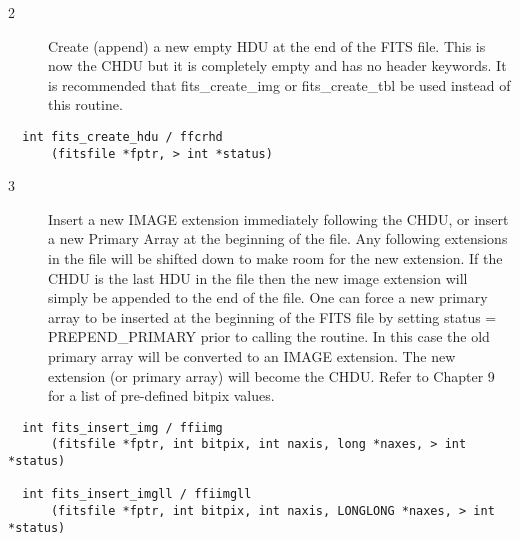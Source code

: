 \documentclass[11pt]{book}
\begin{document}
\begin{description}
\item[2 ] Create (append) a new empty HDU at the end of the FITS file.
    This is now  the CHDU but it is completely empty and has
    no header keywords.  It is recommended that fits\_create\_img or
 fits\_create\_tbl be used instead of this routine. \label{ffcrhd}
\end{description}

\begin{verbatim}
  int fits_create_hdu / ffcrhd
      (fitsfile *fptr, > int *status)
\end{verbatim}

\begin{description}
\item[3 ] Insert a new IMAGE extension immediately following the CHDU, or
    insert a new Primary Array at the beginning of the file.  Any
    following extensions in the file will be shifted down to make room
    for the new extension.  If the CHDU is the last HDU in the file
    then the new image extension will simply be appended to the end of
    the file.   One can force a new primary array to be inserted at the
    beginning of the FITS file by setting status = PREPEND\_PRIMARY prior
    to calling the routine.  In this case the old primary array will be
    converted to an IMAGE extension. The new extension (or primary
    array) will become the CHDU.  Refer to Chapter 9 for a list of
   pre-defined bitpix values.  \label{ffiimg}
\end{description}

\begin{verbatim}
  int fits_insert_img / ffiimg
      (fitsfile *fptr, int bitpix, int naxis, long *naxes, > int *status)

  int fits_insert_imgll / ffiimgll
      (fitsfile *fptr, int bitpix, int naxis, LONGLONG *naxes, > int *status)
\end{verbatim}
\end{document}
